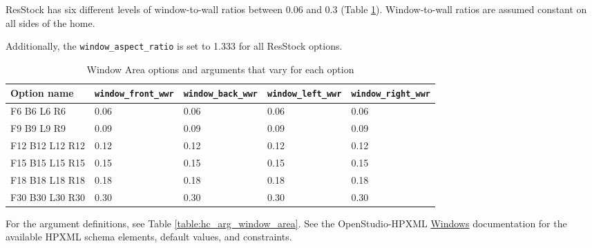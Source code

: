 ResStock has six different levels of window-to-wall ratios between 0.06 and 0.3 (Table \ref{table:hc_opt_window_area}). Window-to-wall ratios are assumed constant on all sides of the home.

Additionally, the \texttt{window\_aspect\_ratio} is set to 1.333 for all ResStock options.

\begin{longtable}[]{|p{}|p{2.5cm}|p{2.5cm}|p{2.5cm}|p{2.5cm}|} \caption{Window Area options and arguments that vary for each option} \label{table:hc_opt_window_area} \\  

\toprule\noalign{}
Option name & \texttt{window\_front\_wwr} &
\texttt{window\_back\_wwr} & \texttt{window\_left\_wwr} &
\texttt{window\_right\_wwr}  
 \\
\midrule\noalign{}
\endhead
\bottomrule\noalign{}
\endlastfoot
F6 B6 L6 R6 & 0.06 & 0.06 & 0.06 & 0.06 
 \\
F9 B9 L9 R9 & 0.09 & 0.09 & 0.09 & 0.09   
 \\
F12 B12 L12 R12 & 0.12 & 0.12 & 0.12 & 0.12  \\
F15 B15 L15 R15  & 0.15 & 0.15 & 0.15 & 0.15 \\
F18 B18 L18 R18 & 0.18 & 0.18 & 0.18 & 0.18 \\
F30 B30 L30 R30 & 0.30 & 0.30 & 0.30 & 0.30\\
\end{longtable}
For the argument definitions, see Table \ref{table:hc_arg_window_area}. See the OpenStudio-HPXML \href{https://openstudio-hpxml.readthedocs.io/en/v1.8.1/workflow_inputs.html#hpxml-windows}{Windows} documentation for the available HPXML schema elements, default values, and constraints.

